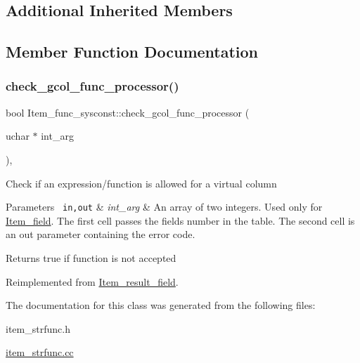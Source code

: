 \subsection*{Additional Inherited Members}


\subsection{Member Function Documentation}
\mbox{\label{classItem__func__sysconst_afef78b3a992b62b9c1155e0074e8ab72}} 
\subsubsection{\texorpdfstring{check\+\_\+gcol\+\_\+func\+\_\+processor()}{check\_gcol\_func\_processor()}}
{\footnotesize\ttfamily bool Item\+\_\+func\+\_\+sysconst\+::check\+\_\+gcol\+\_\+func\+\_\+processor (\begin{DoxyParamCaption}\item[{uchar $\ast$}]{int\+\_\+arg }\end{DoxyParamCaption})\hspace{0.3cm}{\ttfamily [inline]}, {\ttfamily [virtual]}}

Check if an expression/function is allowed for a virtual column


\begin{DoxyParams}[1]{Parameters}
\mbox{\texttt{ in,out}}  & {\em int\+\_\+arg} & An array of two integers. Used only for \mbox{\hyperlink{classItem__field}{Item\+\_\+field}}. The first cell passes the field\textquotesingle{}s number in the table. The second cell is an out parameter containing the error code.\\
\hline
\end{DoxyParams}
\begin{DoxyReturn}{Returns}
true if function is not accepted 
\end{DoxyReturn}


Reimplemented from \mbox{\hyperlink{classItem__result__field_a12324702e7f419b47de45e3505730441}{Item\+\_\+result\+\_\+field}}.



The documentation for this class was generated from the following files\+:\begin{DoxyCompactItemize}
\item 
item\+\_\+strfunc.\+h\item 
\mbox{\hyperlink{item__strfunc_8cc}{item\+\_\+strfunc.\+cc}}\end{DoxyCompactItemize}
